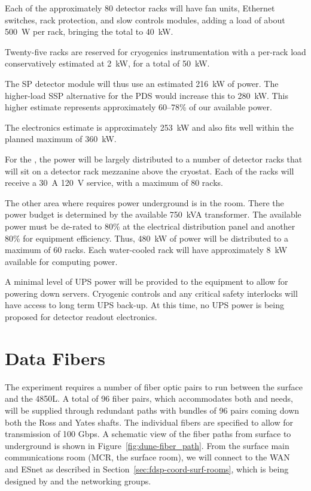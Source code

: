 Each of the approximately 80 detector racks will have fan units,
Ethernet switches, rack protection, and slow controls modules, adding
a load of about 500~W per rack, bringing the total to 40~kW.

Twenty-five racks are reserved for cryogenics instrumentation with a
per-rack load conservatively estimated at 2~kW, for a total of 50~kW.

The SP detector module will thus use an estimated 216~kW of power. The
higher-load SSP alternative for the PDS would increase this to
280~kW. This higher estimate represents approximately 60--78\% of
our available power.

The  electronics estimate is
approximately 253~kW and also fits well within the planned maximum of
360~kW.

For the , the power will be largely distributed to a number
of detector racks that will sit on a detector rack mezzanine above
the cryostat.  Each of the racks will receive a \SI{30}{A} \SI{120}{V} 
service, with a maximum of 80 racks.

The other area where  requires power underground is in the 
room.  There the power budget is determined by the available 750~kVA
transformer.  The available power must be de-rated to 80\% at
the electrical distribution panel and another 80\% for equipment
efficiency.  Thus, 480~kW of power will be distributed to a maximum of
60 racks.  Each water-cooled rack will have approximately 8~kW
available for computing power.

A minimal level of UPS power will be provided to the  equipment to
allow for powering down servers.  Cryogenic controls and any
critical safety interlocks will have access to long term UPS back-up.
At this time, no UPS power is being proposed for detector readout
electronics.


\section{Data Fibers}
\label{sec:fdsp-coord-faci-fibers}


The  experiment requires a number of fiber optic pairs to
run between the surface and the 4850L.  A total of 96 fiber
pairs, which accommodates both  and  needs, will
be supplied through redundant paths with bundles of 96 pairs coming
down both the Ross and Yates shafts.  The individual fibers are
specified to allow for transmission of 100 Gbps.  A schematic view of
the fiber paths from surface to underground is shown in
Figure~\ref{fig:dune-fiber_path}. From the surface main communications room (MCR, the surface 
room), we will connect to the WAN and ESnet as described in
Section~\ref{sec:fdsp-coord-surf-rooms}, which is being designed by
 and the  networking groups.

